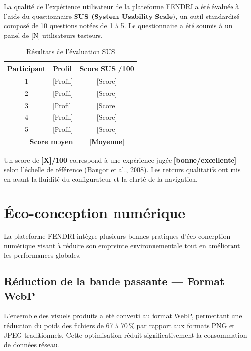 La qualité de l'expérience utilisateur de la plateforme FENDRI a été évaluée à l'aide du questionnaire \textbf{SUS (System Usability Scale)}, un outil standardisé composé de 10 questions notées de 1 à 5. Le questionnaire a été soumis à un panel de [N] utilisateurs testeurs.

\begin{table}[H]
\centering
\caption{Résultats de l'évaluation SUS}
\label{tab:sus}
\begin{tabularx}{\textwidth}{c X c}
\toprule
\rowcolor{beige}
\textbf{Participant} & \textbf{Profil} & \textbf{Score SUS /100} \\
\midrule
1  & [Profil] & [Score] \\
2  & [Profil] & [Score] \\
3  & [Profil] & [Score] \\
4  & [Profil] & [Score] \\
5  & [Profil] & [Score] \\
\midrule
\multicolumn{2}{r}{\textbf{Score moyen}} & \textbf{[Moyenne]} \\
\bottomrule
\end{tabularx}
\end{table}

\noindent Un score de \textbf{[X]/100} correspond à une expérience jugée \textbf{[bonne/excellente]} selon l'échelle de référence (Bangor et al., 2008). Les retours qualitatifs ont mis en avant la fluidité du configurateur et la clarté de la navigation.

\section{Éco-conception numérique}

La plateforme FENDRI intègre plusieurs bonnes pratiques d'éco-conception numérique visant à réduire son empreinte environnementale tout en améliorant les performances globales.

\subsection*{Réduction de la bande passante — Format WebP}
L'ensemble des visuels produits a été converti au format WebP, permettant une réduction du poids des fichiers de 67 à 70\,\% par rapport aux formats PNG et JPEG traditionnels. Cette optimisation réduit significativement la consommation de données réseau.

